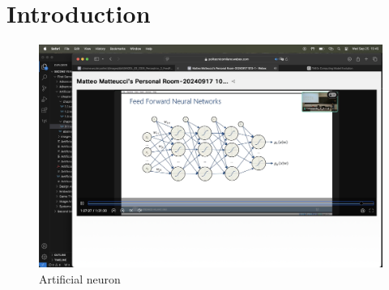 \section{Introduction}

\begin{figure}[H]
    \centering
    \includegraphics[width=0.75\linewidth]{images/ffnn.png}
    \caption{Artificial neuron}
\end{figure}